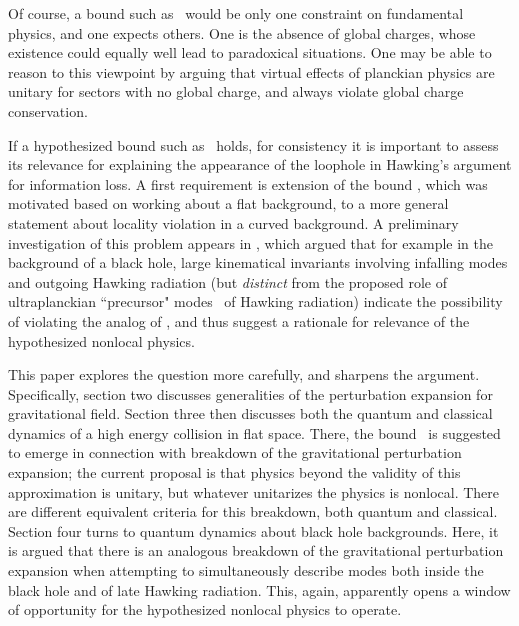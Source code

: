 Of course, a bound such as \gravbd\ would be only one constraint on fundamental physics,  and one expects others.  One is the absence of global charges, whose existence could equally well lead to paradoxical situations. One may be able to reason to this viewpoint by arguing that virtual effects of planckian physics are unitary for sectors with no global charge, and always violate global charge conservation.

If a hypothesized bound such as \gravbd\ holds, for consistency it is important to assess its relevance for explaining the appearance of the loophole in Hawking's argument for information loss.   A first requirement is extension of the bound \gravbd, which was motivated based on working about a flat background, to a more general statement about locality violation in a curved background.   A preliminary investigation of this problem appears in , which argued that for example in the background of a black hole, large kinematical invariants involving infalling modes and outgoing Hawking radiation (but {\it distinct} from the proposed role of ultraplanckian ``precursor" modes~ of Hawking radiation) indicate the possibility of violating the analog of \gravbd, and thus suggest a rationale for relevance of the hypothesized nonlocal physics.   

This paper explores the question more carefully, and sharpens the argument.  Specifically, section two discusses generalities of the perturbation expansion for gravitational field.  Section three then discusses both the quantum and classical dynamics of a high energy collision in flat space.  There, the bound \gravbd\ is suggested to emerge in connection with breakdown of the gravitational perturbation expansion; the current proposal is that physics beyond the validity of this  approximation is unitary, but whatever unitarizes the physics is nonlocal.  There are different equivalent criteria for this breakdown, both quantum and classical.  Section four turns to quantum dynamics about black hole backgrounds.  Here, it is argued that there is an analogous breakdown of the gravitational perturbation expansion when attempting to simultaneously describe modes both inside the black hole and of late Hawking radiation.  This, again, apparently opens a window of opportunity for the hypothesized nonlocal physics to operate. 




